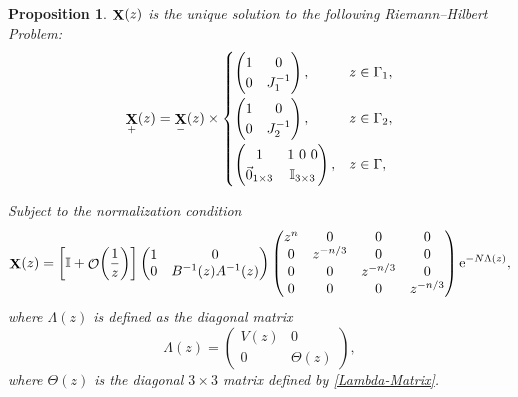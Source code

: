 \documentclass[10pt,a4paper]{amsart}
\DeclareMathOperator{\OO}{\mathcal{O}}
\DeclareMathOperator{\XX}{{\bf X}}
\numberwithin{equation}{section}
\newtheorem{Proposition}[Theorem]{Proposition}
 { \theoremstyle{definition}
\newtheorem{Definition}[Theorem]{Definition}
\newtheorem{Note}[Theorem]{Note}
\newtheorem{Example}[Theorem]{Example}
\newtheorem{Remark}[Theorem]{Remark} }
\begin{document}
 \begin{Proposition}
 $\XX(z)$ is the unique solution to the following Riemann--Hilbert Problem:
 \begin{equation*}
 \XX_{+}(z) = \XX_{-}(z) \times
 \begin{cases}
 \begin{pmatrix}
 1 & 0\\
 0 & J_1^{-1}
 \end{pmatrix}, & z \in \Gamma_1,\vspace{1mm}\\
 \begin{pmatrix}
 1 & 0\\
 0 & J_2^{-1}
 \end{pmatrix}, & z \in \Gamma_2,\vspace{1mm}\\
 \begin{pmatrix}
 1 & 1 \ 0 \ 0\\
 \vec{0}_{1\times 3} & \mathbb{I}_{3\times3}
 \end{pmatrix}, & z \in \Gamma,\\
 \end{cases}
 \end{equation*}

 Subject to the normalization condition
 \begin{align}\label{X-asymptotics}
 \XX(z) =
 \biggl[\mathbb{I} + \OO\biggl(\frac{1}{z}\biggr)\biggr]\begin{pmatrix}
 1 & 0\\
 0 & B^{-1}(z) A^{-1}(z)
 \end{pmatrix}
 \begin{pmatrix}
 z^n & 0 & 0 & 0\\
 0 & z^{-n/3} & 0 & 0\\
 0 & 0 & z^{-n/3} & 0\\
 0 & 0 & 0 & z^{-n/3}
 \end{pmatrix}{\rm e}^{-N\Lambda(z)},
 \end{align}
where $\Lambda(z)$ is defined as the diagonal matrix
 \begin{equation*}
 \Lambda(z) =
 \begin{pmatrix}
 V(z) & 0\\
 0 & \Theta(z)
 \end{pmatrix},
 \end{equation*}
where $\Theta(z)$ is the diagonal $3\times 3$ matrix defined by \eqref{Lambda-Matrix}.
 \end{Proposition}
\end{document}
